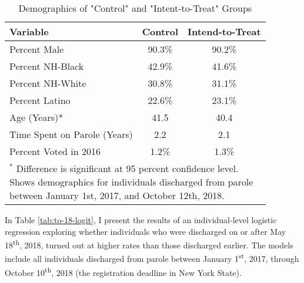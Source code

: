 \documentclass[
  12pt,
]{article}
\begin{document}
\begin{singlespace}

\begin{table}[H]
\fontsize{10}{12}\selectfont

\caption{\label{tab:demo-rd} Demographics of "Control" and "Intent-to-Treat" Groups}
\centering
\begin{tabular}[t]{lcc}
\toprule
Variable & Control & Intend-to-Treat\\
\midrule
Percent Male & 90.3\% & 90.2\%\\
Percent NH-Black & 42.9\% & 41.6\%\\
Percent NH-White & 30.8\% & 31.1\%\\
Percent Latino & 22.6\% & 23.1\%\\
Age (Years)* & 41.5 & 40.4\\
Time Spent on Parole (Years) & 2.2 & 2.1\\
Percent Voted in 2016 & 1.2\% & 1.3\%\\
\bottomrule
\multicolumn{3}{l}{\scriptsize{\parbox{.5\linewidth}{\vspace{2pt}$^*$ Difference is significant at 95 percent confidence level. \\Shows demographics for individuals discharged from parole \\between January 1st, 2017, and October 12th, 2018.}}}
\end{tabular}
\end{table}

\end{singlespace}

In Table \ref{tab:to-18-logit}, I present the results of an individual-level logistic regression exploring whether individuals who were discharged on or after May 18\textsuperscript{th}, 2018, turned out at higher rates than those discharged earlier. The models include all individuals discharged from parole between January 1\textsuperscript{st}, 2017, through October 10\textsuperscript{th}, 2018 (the registration deadline in New York State).
\end{document}
